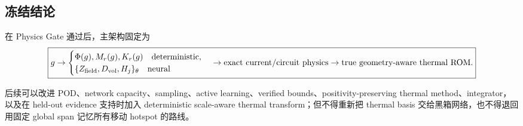 \subsection{冻结结论}
在 Physics Gate 通过后，主架构固定为
\begin{equation}
\boxed{
 g
 \rightarrow
 \begin{cases}
 \Phi(g),M_r(g),K_r(g)\quad\text{deterministic},\\
 \{Z_{\rm field},D_{\rm vol},H_j\}_\theta\quad\text{neural}
 \end{cases}
 \rightarrow\text{exact current/circuit physics}
 \rightarrow\text{true geometry-aware thermal ROM}.
}
\end{equation}

后续可以改进 POD、network capacity、sampling、active learning、verified bounds、positivity-preserving thermal method、integrator，以及在 held-out evidence 支持时加入 deterministic scale-aware thermal transform；但不得重新把 thermal basis 交给黑箱网络，也不得退回用固定 global span 记忆所有移动 hotspot 的路线。
